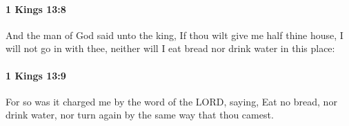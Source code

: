 		\paragraph{1 Kings 13:8} %
			\label{1KINGS-13-8}

			And the man of God said unto the king, If thou wilt give me half thine house, I will not go in with thee, neither will I eat bread nor drink water in this place:


		\paragraph{1 Kings 13:9} %
			\label{1KINGS-13-9}

			For so was it charged me by the word of the LORD, saying, Eat no bread, nor drink water, nor turn again by the same way that thou camest.


